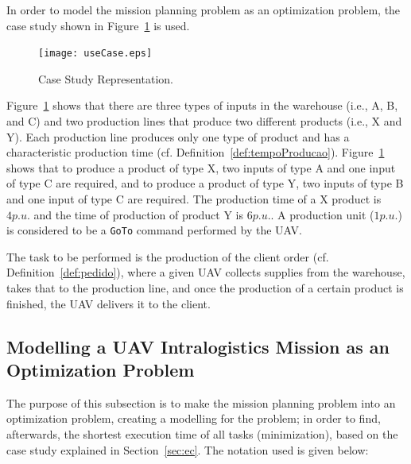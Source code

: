 \documentclass[conference,harvard,brazil,english]{sbatex}
\begin{document}
In order to model the mission planning problem as an optimization problem, the case study shown in Figure~\ref{fig:useCase} is used.
%
\begin{figure}[ht]
	\centering
	\texttt{[image: useCase.eps]}
	\caption{Case Study Representation.\label{fig:useCase}}
\end{figure}
	
Figure~\ref{fig:useCase} shows that there are three types of inputs in the warehouse (i.e., A, B, and C) and two production lines that produce two different products (i.e., X and Y). Each production line produces only one type of product and has a characteristic production time (cf. Definition~\ref{def:tempoProducao}). Figure~\ref{fig:useCase} shows that to produce a product of type X, two inputs of type A and one input of type C are required, and to produce a product of type Y, two inputs of type B and one input of type C are required. The production time of a X product is $4 p.u.$ and the time of production of product Y is $6 p.u.$. A production unit ($1 p.u.$) is considered to be a \texttt{GoTo} command performed by the UAV.

The task to be performed is the production of the client order (cf. Definition~\ref{def:pedido}), where a given UAV collects supplies from the warehouse, takes that to the production line, and once the production of a certain product is finished, the UAV delivers it to the client.

\subsection{Modelling a UAV Intralogistics Mission as an Optimization Problem }
\label{ssec:modelo}

The purpose of this subsection is to make the mission planning problem into an optimization problem, creating a modelling for the problem; in order to find, afterwards, the shortest execution time of all tasks (minimization), based on the case study explained in Section~\ref{sec:ec}. The notation used is given below:
\end{document}
